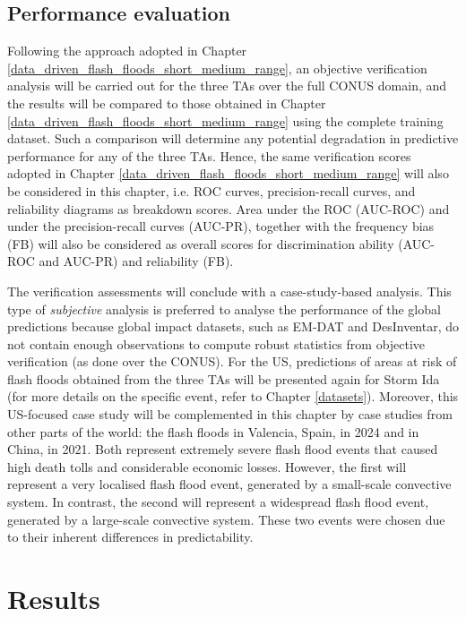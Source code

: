 \subsection{Performance evaluation}

Following the approach adopted in Chapter \ref{data_driven_flash_floods_short_medium_range}, an objective verification analysis will be carried out for the three TAs over the full CONUS domain, and the results will be compared to those obtained in Chapter \ref{data_driven_flash_floods_short_medium_range} using the complete training dataset. Such a comparison will determine any potential degradation in predictive performance for any of the three TAs. Hence, the same verification scores adopted in Chapter \ref{data_driven_flash_floods_short_medium_range} will also be considered in this chapter, i.e. ROC curves, precision-recall curves, and reliability diagrams as breakdown scores. Area under the ROC (AUC-ROC) and under the precision-recall curves (AUC-PR), together with the frequency bias (FB) will also be considered as overall scores for discrimination ability (AUC-ROC and AUC-PR) and reliability (FB).
 
The verification assessments will conclude with a case-study-based analysis. This type of \textit{subjective} analysis is preferred to analyse the performance of the global predictions because global impact datasets, such as EM-DAT and DesInventar, do not contain enough observations to compute robust statistics from objective verification (as done over the CONUS). For the US, predictions of areas at risk of flash floods obtained from the three TAs will be presented again for Storm Ida (for more details on the specific event, refer to Chapter \ref{datasets}). Moreover, this US-focused case study will be complemented in this chapter by case studies from other parts of the world: the flash floods in Valencia, Spain, in 2024 and in China, in 2021. Both represent extremely severe flash flood events that caused high death tolls and considerable economic losses. However, the first will represent a very localised flash flood event, generated by a small-scale convective system. In contrast, the second will represent a widespread flash flood event, generated by a large-scale convective system. These two events were chosen due to their inherent differences in predictability.


\section{Results}
\label{regional_to_global_training_results}

